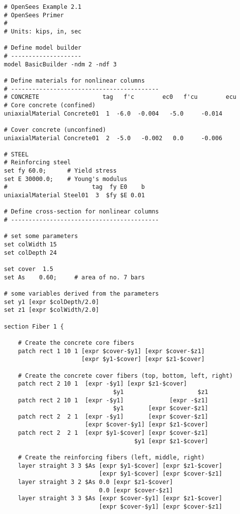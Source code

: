 \documentclass[12pt]{article}
\begin{document}
{\sf\small
\begin{verbatim}
# OpenSees Example 2.1
# OpenSees Primer
#
# Units: kips, in, sec

# Define model builder
# --------------------
model BasicBuilder -ndm 2 -ndf 3

# Define materials for nonlinear columns
# ------------------------------------------
# CONCRETE                  tag   f'c        ec0   f'cu        ecu
# Core concrete (confined)
uniaxialMaterial Concrete01  1  -6.0  -0.004   -5.0     -0.014

# Cover concrete (unconfined)
uniaxialMaterial Concrete01  2  -5.0   -0.002   0.0     -0.006

# STEEL
# Reinforcing steel 
set fy 60.0;      # Yield stress
set E 30000.0;    # Young's modulus
#                        tag  fy E0    b
uniaxialMaterial Steel01  3  $fy $E 0.01

# Define cross-section for nonlinear columns
# ------------------------------------------

# set some parameters
set colWidth 15
set colDepth 24 

set cover  1.5
set As    0.60;     # area of no. 7 bars

# some variables derived from the parameters
set y1 [expr $colDepth/2.0]
set z1 [expr $colWidth/2.0]

section Fiber 1 {

    # Create the concrete core fibers
    patch rect 1 10 1 [expr $cover-$y1] [expr $cover-$z1] 
                      [expr $y1-$cover] [expr $z1-$cover]

    # Create the concrete cover fibers (top, bottom, left, right)
    patch rect 2 10 1  [expr -$y1] [expr $z1-$cover] 
                               $y1                     $z1
    patch rect 2 10 1  [expr -$y1]             [expr -$z1] 
                               $y1       [expr $cover-$z1]
    patch rect 2  2 1  [expr -$y1]       [expr $cover-$z1] 
                       [expr $cover-$y1] [expr $z1-$cover]
    patch rect 2  2 1  [expr $y1-$cover] [expr $cover-$z1] 
                                     $y1 [expr $z1-$cover]

    # Create the reinforcing fibers (left, middle, right)
    layer straight 3 3 $As [expr $y1-$cover] [expr $z1-$cover] 
                           [expr $y1-$cover] [expr $cover-$z1]
    layer straight 3 2 $As 0.0 [expr $z1-$cover] 
                           0.0 [expr $cover-$z1]
    layer straight 3 3 $As [expr $cover-$y1] [expr $z1-$cover] 
                           [expr $cover-$y1] [expr $cover-$z1]


\end{verbatim}}
\end{document}
